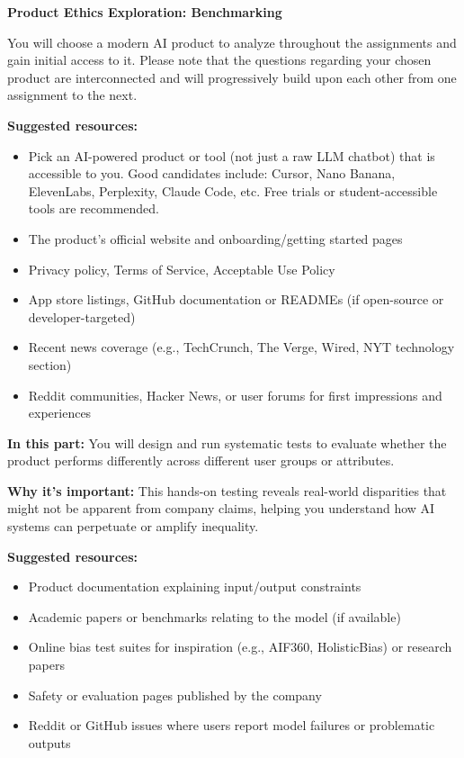 \item {\bf Product Ethics Exploration: Benchmarking}

You will choose a modern AI product to analyze throughout the assignments and gain initial access to it. Please note that the questions regarding your chosen product are interconnected and will progressively build upon each other from one assignment to the next.

\textbf{Suggested resources:}
\begin{itemize}
    \item Pick an AI-powered product or tool (not just a raw LLM chatbot) that is accessible to you. Good candidates include: Cursor, Nano Banana, ElevenLabs, Perplexity, Claude Code, etc. Free trials or student-accessible tools are recommended.
    \item The product's official website and onboarding/getting started pages
    \item Privacy policy, Terms of Service, Acceptable Use Policy
    \item App store listings, GitHub documentation or READMEs (if open-source or developer-targeted)
    \item Recent news coverage (e.g., TechCrunch, The Verge, Wired, NYT technology section)
    \item Reddit communities, Hacker News, or user forums for first impressions and experiences
\end{itemize}

\textbf{In this part:} You will design and run systematic tests to evaluate whether the product performs differently across different user groups or attributes.

\vspace{2mm}

\textbf{Why it's important:} This hands-on testing reveals real-world disparities that might not be apparent from company claims, helping you understand how AI systems can perpetuate or amplify inequality.

\vspace{2mm}

\textbf{Suggested resources:}
\begin{itemize}
  \item Product documentation explaining input/output constraints
  \item Academic papers or benchmarks relating to the model (if available)
  \item Online bias test suites for inspiration (e.g., AIF360, HolisticBias) or research papers
  \item Safety or evaluation pages published by the company
  \item Reddit or GitHub issues where users report model failures or problematic outputs
\end{itemize}


\begin{enumerate}
    
    
    
    
    
\end{enumerate}